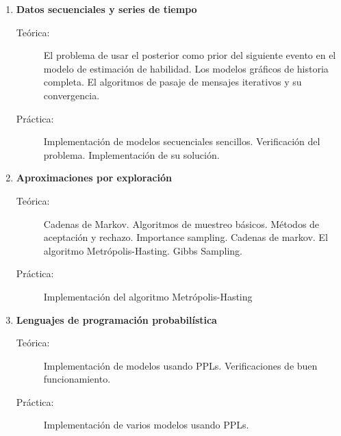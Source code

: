 \documentclass[10pt]{article}
\begin{document}
\begin{enumerate}

\vspace{0.1cm}
\item \textbf{Datos secuenciales y series de tiempo}
\vspace{-0.15cm}
\begin{description}
\item[Teórica:] El problema de usar el posterior como prior del siguiente evento en el modelo de estimación de habilidad. Los modelos gráficos de historia completa. El algoritmos de pasaje de mensajes iterativos y su convergencia.
\item[Práctica:] Implementación de modelos secuenciales sencillos. Verificación del problema. Implementación de su solución.
\end{description}


\vspace{0.1cm}
\item \textbf{Aproximaciones por exploración}
\vspace{-0.15cm}
\begin{description}
\item[Teórica:] Cadenas de Markov. Algoritmos de muestreo básicos. Métodos de aceptación y rechazo. Importance sampling. Cadenas de markov. El algoritmo Metrópolis-Hasting. Gibbs Sampling.
\item[Práctica:] Implementación del algoritmo Metrópolis-Hasting
\end{description}


\vspace{0.1cm}
\item \textbf{Lenguajes de programación probabilística}
\vspace{-0.15cm}
\begin{description}
\item[Teórica:] Implementación de modelos usando PPLs. Verificaciones de buen funcionamiento. 
\item[Práctica:] Implementación de varios modelos usando PPLs.
\end{description}


\end{enumerate}

\nocite{jaynes1984-bayesianBackground, mcelreath2020-rethinking, bishop2006-PRML, pearl2009-causality, cinelli2021-crashCourse, stan-userGuide, martin2021-BMCP, samaja1999-epistemologiaMetodologia }

{

}
\end{document}
